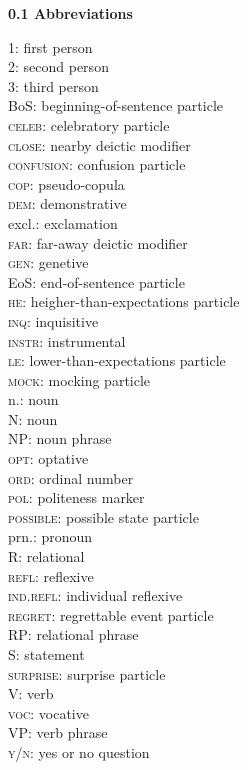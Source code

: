 \documentclass{article}[10pt]
\begin{document}
{\bf 0.1 Abbreviations}
\begin{multicols}{3}
\noindent
\textsc{1}: first person\\
\textsc{2}: second person\\
\textsc{3}: third person\\
BoS: beginning-of-sentence particle\\
\textsc{celeb}: celebratory particle\\
\textsc{close}: nearby deictic modifier\\
\textsc{confusion}: confusion particle\\
\textsc{cop}: pseudo-copula\\
\textsc{dem}: demonstrative\\
excl.: exclamation\\
\textsc{far}: far-away deictic modifier\\
\textsc{gen}: genetive\\
EoS: end-of-sentence particle\\
\textsc{he}: heigher-than-expectations particle\\
\textsc{inq}: inquisitive\\
\textsc{instr}: instrumental\\
\textsc{le}: lower-than-expectations particle\\
\textsc{mock}: mocking particle\\
n.: noun\\
N: noun\\
NP: noun phrase\\
\textsc{opt}: optative\\
\textsc{ord}: ordinal number\\
\textsc{pol}: politeness marker\\
\textsc{possible}: possible state particle\\
prn.: pronoun\\
R: relational\\
\textsc{refl}: reflexive\\
\textsc{ind.refl}: individual reflexive\\
\textsc{regret}: regrettable event particle\\
RP: relational phrase\\
S: statement\\
\textsc{surprise}: surprise particle\\
V: verb\\
\textsc{voc}: vocative\\
VP: verb phrase\\
\textsc{y/n}: yes or no question\\
\end{multicols}
\end{document}
